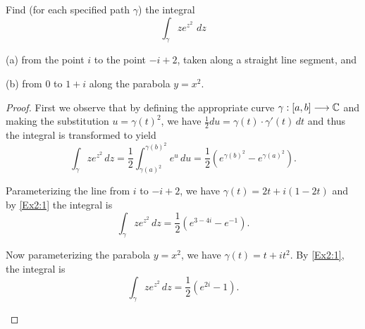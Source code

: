 \documentclass[10pt]{amsart}
\begin{document}
\begin{thm}
  \label{Ex2}
  Find (for each specified path $\gamma$) the integral 
  $$
  \int_\gamma z e^{z^2} \, \,dz
  $$
\item\item{(a)}
  from the point $i$ to the point $-i + 2$, taken along a straight line segment, and
\item\item{(b)}
  from 0 to $1 + i$ along the parabola $y = x^2$.
  \begin{proof}
    First we observe that by defining the appropriate curve $\gamma:[a,b] \longrightarrow \mathbb{C}$ and making the substitution $u = \gamma(t)^2$, we have $\frac{1}{2}du = \gamma(t)\cdot\gamma'(t)\,dt$ and thus the integral is transformed to yield
    \begin{equation}
      \label{Ex2:1}
      \int_\gamma z e^{z^2}\,dz = \frac{1}{2}\int_{\gamma(a)^2}^{\gamma(b)^2} e^u\,du = \frac{1}{2}(e^{\gamma(b)^2} - e^{\gamma(a)^2}).
    \end{equation}
    \begin{alphaenum}
    \item
      Parameterizing the line from $i$ to $-i + 2$, we have $\gamma(t) =  2t + i(1-2t)$ and by \eqref{Ex2:1} the integral is
      $$\int_{\gamma}ze^{z^2}\,dz = \frac{1}{2} (e^{3-4i} - e^{-1}).$$
    \item
      Now parameterizing the parabola $y = x^2$, we have $\gamma(t) = t + it^2$.  By \eqref{Ex2:1}, the integral is
      $$\int_{\gamma}ze^{z^2}\,dz = \frac{1}{2} (e^{2i} - 1).$$
    \end{alphaenum}
  \end{proof}
\end{thm}
\end{document}
